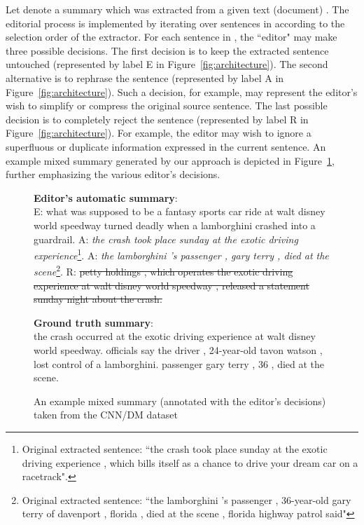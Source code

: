 \documentclass{article}
\begin{document}
Let  denote a summary which was extracted from a given text (document) .
The editorial process is implemented by iterating over sentences in  according to the selection order of the extractor.
For each sentence in , the ``editor" may make three possible decisions. The first decision is to keep the extracted sentence untouched (represented by label \textsf{E} in Figure~\ref{fig:architecture}). 
The second alternative is to rephrase the sentence (represented by label \textsf{A} in Figure~\ref{fig:architecture}). Such a decision, for example, may represent the editor's wish to simplify or compress the original source sentence. The last possible decision is to completely reject the sentence (represented by label \textsf{R} in Figure~\ref{fig:architecture}). For example, the editor may wish to ignore a superfluous or duplicate information expressed in the current sentence.
An example mixed summary generated by our approach is depicted in Figure~\ref{example summary}, further emphasizing the various editor's decisions.

\begin{figure}[tbh]
\begin{tcolorbox}[colback = white,boxrule=0.5pt]
  \textbf{Editor's automatic summary}:\\
  \textsf{E}: what was supposed to be a fantasy sports car ride at walt disney world speedway turned deadly when a lamborghini crashed into a guardrail.
  \textsf{A}: \textit{the crash took place sunday at the exotic driving experience}\footnote{Original extracted sentence: ``the crash took place sunday at the exotic driving experience , which bills itself as a chance to drive your dream car on a racetrack".}.
  \textsf{A}: \textit{the lamborghini 's passenger , gary terry , died at the scene}\footnote{Original extracted sentence: ``the lamborghini 's passenger , 36-year-old gary terry of davenport , florida , died at the scene , florida highway patrol said"}.
  \textsf{R}: \st{petty holdings , which operates the exotic driving experience at walt disney world speedway , released a statement sunday night about the crash.}
\end{tcolorbox}
\begin{tcolorbox}[colback = white,boxrule=0.5pt]
  \textbf{Ground truth summary}:\\
  the crash occurred at the exotic driving experience at walt disney world speedway. officials say the driver , 24-year-old tavon watson , lost control of a lamborghini. passenger gary terry , 36 , died at the scene.
\end{tcolorbox}\caption{An example mixed summary (annotated with the editor's decisions) taken from the CNN/DM dataset}\label{example summary}
\end{figure}
\end{document}
